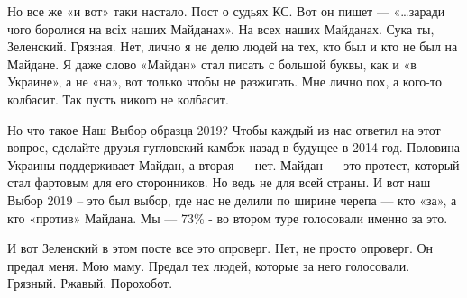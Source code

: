 Но все же «и вот» таки настало. Пост о судьях КС. Вот он пишет --- «…заради чого
боролися на всіх наших Майданах». На всех наших Майданах. Сука ты, Зеленский.
Грязная. Нет, лично я не делю людей на тех, кто был и кто не был на Майдане. Я
даже слово «Майдан» стал писать с большой буквы, как и «в Украине», а не «на»,
вот только чтобы не разжигать. Мне лично пох, а кого-то колбасит. Так пусть
никого не колбасит.

Но что такое Наш Выбор образца 2019? Чтобы каждый из нас ответил на этот
вопрос, сделайте друзья гугловский камбэк назад в будущее в 2014 год. Половина
Украины поддерживает Майдан, а вторая --- нет. Майдан --- это протест, который стал
фартовым для его сторонников. Но ведь не для всей страны. И вот наш Выбор 2019
– это был выбор, где нас не делили по ширине черепа --- кто «за», а кто «против»
Майдана. Мы --- 73\% - во втором туре голосовали именно за это.

И вот Зеленский в этом посте все это опроверг. Нет, не просто опроверг. Он
предал меня. Мою маму. Предал тех людей, которые за него голосовали. Грязный.
Ржавый. Порохобот.

